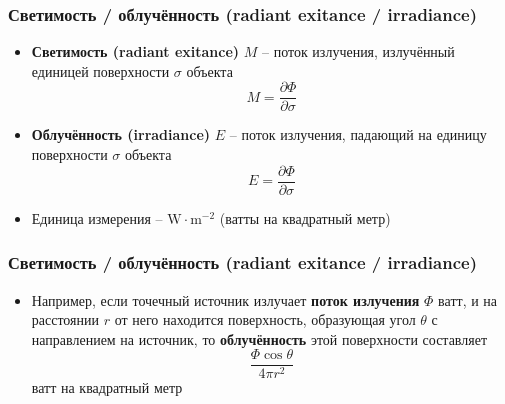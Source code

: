 \documentclass[handout,10pt]{beamer}
\begin{document}
\begin{frame}
\frametitle{Светимость / облучённость (radiant exitance / irradiance)}
\begin{itemize}
\item \textbf{Светимость (radiant exitance)} \begin{math}M\end{math} -- поток излучения, излучённый единицей поверхности \begin{math}\sigma\end{math} объекта
\begin{equation*}
M = \frac{\partial \Phi}{\partial \sigma}
\end{equation*}
\pause
\item \textbf{Облучённость (irradiance)} \begin{math}E\end{math} -- поток излучения, падающий на единицу поверхности \begin{math}\sigma\end{math} объекта
\begin{equation*}
E = \frac{\partial \Phi}{\partial \sigma}
\end{equation*}
\pause
\item Единица измерения -- \begin{math}\text{W}\cdot \text{m}^{-2}\end{math} (ватты на квадратный метр)
\end{itemize}
\end{frame}

\begin{frame}
\frametitle{Светимость / облучённость (radiant exitance / irradiance)}
\begin{itemize}
\item Например, если точечный источник излучает \textbf{поток излучения} \begin{math}\Phi\end{math} ватт, и на расстоянии \begin{math}r\end{math} от него находится поверхность, образующая угол \begin{math}\theta\end{math} с направлением на источник, то \textbf{облучённость} этой поверхности составляет \begin{equation*}\frac{\Phi\cos\theta}{4\pi r^2}\end{equation*} ватт на квадратный метр
\end{itemize}
\end{frame}
\end{document}
